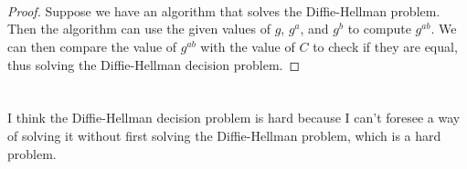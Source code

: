 \documentclass[
  coursecode={MTHE 418},
  assignmentname={Homework \homeworknumber},
  studentnumber=20053722,
  name={Bryan Hoang},
  draft,
]{
  ltxanswer%
}
\begin{document}
  \begin{questions}
    \setcounter{question}{\questionnumber}
    \addtocounter{question}{-1}
    \question[10]\
    \begin{parts}
      \part{}
      \begin{solution}
        \begin{proof}
          Suppose we have an algorithm that solves the Diffie-Hellman problem. Then the algorithm can use the given values of \(g\), \(g^{a}\), and \(g^{b}\) to compute \(g^{ab}\). We can then compare the value of \(g^{ab}\) with the value of \(C\) to check if they are equal, thus solving the Diffie-Hellman decision problem.
        \end{proof}
      \end{solution}

      \part{}
      \begin{solution}
        I think the Diffie-Hellman decision problem is hard because I can't foresee a way of solving it without first solving the Diffie-Hellman problem, which is a hard problem.
      \end{solution}
    \end{parts}
  \end{questions}
\end{document}
